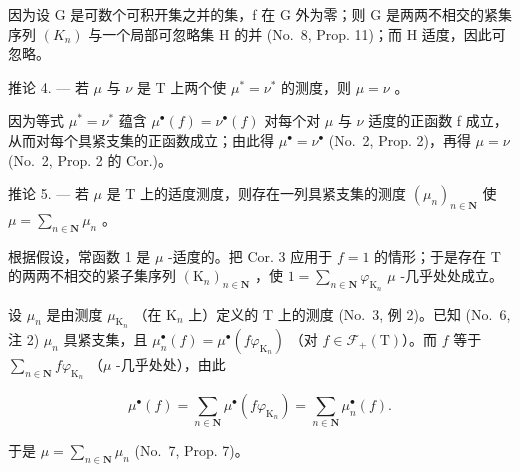 因为设 G 是可数个可积开集之并的集，f 在 G 外为零；则 G 是两两不相交的紧集序列 \((K_{n})\) 与一个局部可忽略集 H 的并 (No.~8, Prop. 11)；而 H 适度，因此可忽略。

推论 4. --- 若 \(\mu\) 与 \(\nu\) 是 T 上两个使 \(\mu^{*} = \nu^{*}\) 的测度，则 \(\mu = \nu\) 。

因为等式 \(\mu^{*}=\nu^{*}\) 蕴含 \(\mu^{\bullet}(f)=\nu^{\bullet}(f)\) 对每个对 \(\mu\) 与 \(\nu\) 适度的正函数 f 成立，从而对每个具紧支集的正函数成立；由此得 \(\mu^{\bullet}=\nu^{\bullet}\) (No.~2, Prop. 2)，再得 \(\mu=\nu\) (No.~2, Prop. 2 的 Cor.)。

推论 5. --- 若 \(\mu\) 是 T 上的适度测度，则存在一列具紧支集的测度 \((\mu_n)_{n \in \mathbf{N}}\) 使 \(\mu = \sum_{n \in \mathbf{N}} \mu_n\) 。

根据假设，常函数 1 是 \(\mu\) -适度的。把 Cor. 3 应用于 \(f = 1\) 的情形；于是存在 T 的两两不相交的紧子集序列 \((\mathrm{K}_n)_{n \in \mathbf{N}}\) ，使 \(1 = \sum_{n \in \mathbf{N}} \varphi_{\mathrm{K}_n}\) \(\mu\) -几乎处处成立。

设 \(\mu_{n}\) 是由测度 \(\mu_{\mathrm{K}_n}\) （在 \(\mathrm{K}_n\) 上）定义的 T 上的测度 (No.~3, 例 2)。已知 (No.~6, 注 2) \(\mu_{n}\) 具紧支集，且 \(\mu_n^\bullet (f) = \mu^\bullet (f\varphi_{\mathrm{K}_n})\) （对 \(f\in \mathcal{F}_{+}(\mathrm{T})\)）。而 \(f\) 等于 \(\sum_{n\in \mathbf{N}}f\varphi_{\mathrm{K}_n}\) （\(\mu\) -几乎处处），由此

\[
\mu^ {\bullet} (f) = \sum_ {n \in \mathbf {N}} \mu^ {\bullet} (f \varphi_ {\mathrm{K} _ {n}}) = \sum_ {n \in \mathbf {N}} \mu_ {n} ^ {\bullet} (f).
\]

于是 \(\mu = \sum_{n\in \mathbf{N}}\mu_n\) (No.~7, Prop. 7)。

